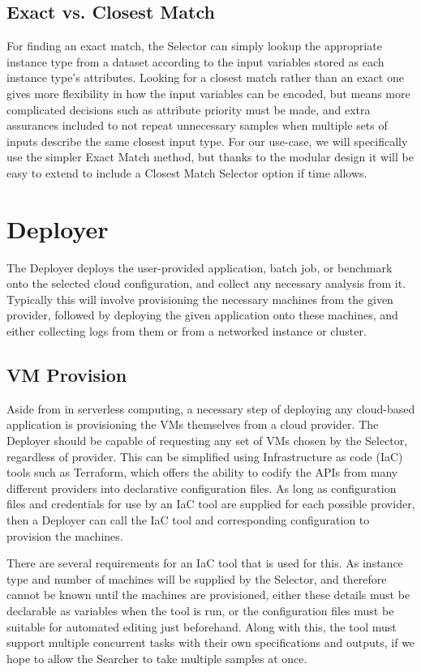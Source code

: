 \documentclass{report}
\begin{document}
\subsection{Exact vs. Closest Match}
For finding an exact match, the Selector can simply lookup the appropriate instance type from a dataset according to the input variables stored as each instance type's attributes. Looking for a closest match rather than an exact one gives more flexibility in how the input variables can be encoded, but means more complicated decisions such as attribute priority must be made, and extra assurances included to not repeat unnecessary samples when multiple sets of inputs describe the same closest input type. For our use-case, we will specifically use the simpler Exact Match method, but thanks to the modular design it will be easy to extend to include a Closest Match Selector option if time allows.


\section{Deployer}
The Deployer deploys the user-provided application, batch job, or benchmark onto the selected cloud configuration, and collect any necessary analysis from it. Typically this will involve provisioning the necessary machines from the given provider, followed by deploying the given application onto these machines, and either collecting logs from them or from a networked instance or cluster. 

\subsection{VM Provision}
Aside from in serverless computing, a necessary step of deploying any cloud-based application is provisioning the VMs themselves from a cloud provider. The Deployer should be capable of requesting any set of VMs chosen by the Selector, regardless of provider. This can be simplified using Infrastructure as code (IaC) tools such as Terraform, which offers the ability to codify the APIs from many different providers into declarative configuration files. As long as configuration files and credentials for use by an IaC tool are supplied for each possible provider, then a Deployer can call the IaC tool and corresponding configuration to provision the machines. 

There are several requirements for an IaC tool that is used for this. As instance type and number of machines will be supplied by the Selector, and therefore cannot be known until the machines are provisioned, either these details must be declarable as variables when the tool is run, or the configuration files must be suitable for automated editing just beforehand. Along with this, the tool must support multiple concurrent tasks with their own specifications and outputs, if we hope to allow the Searcher to take multiple samples at once.
\end{document}
